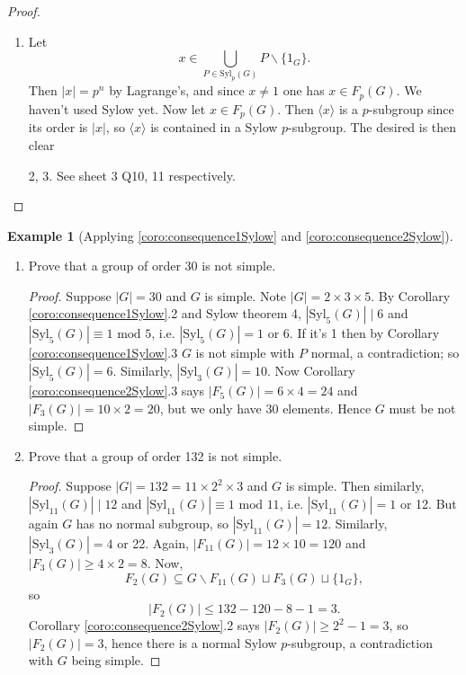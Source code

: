 \documentclass[a4paper]{article}
\newcommand{\Syl}{\text{Syl}}
\newcommand{\Mod}{\text{ mod }}
\theoremstyle{definition}
\newtheorem{example}[defn]{Example}
\begin{document}
\begin{proof}
\begin{enumerate}
\item Let \[
x\in \bigcup_{P\in\Syl_p(G)} P\backslash \{1_G\}.
\]
Then $|x|=p^n$ by Lagrange's, and since $x\neq 1$ one has $x\in F_p(G)$. We haven't used Sylow yet. Now let $x\in F_p(G)$. Then $\langle x\rangle$ is a $p$-subgroup since its order is $|x|$, so $\langle x\rangle$ is contained in a Sylow $p$-subgroup. The desired is then clear
\item[2, 3.] See sheet 3 Q10, 11 respectively.
\end{enumerate}
\end{proof}

\begin{example}[Applying \ref{coro:consequence1Sylow} and \ref{coro:consequence2Sylow}]
\label{example:strategy2}
\begin{enumerate}
\item Prove that a group of order 30 is not simple.
\begin{proof}
Suppose $|G|=30$ and $G$ is simple. Note $|G|=2\times 3\times 5$. By Corollary \ref{coro:consequence1Sylow}.2 and Sylow theorem 4, $|\Syl_5(G)|\mid 6$ and $|\Syl_5(G)|\equiv 1\Mod 5$, i.e. $|\Syl_5(G)|=1$ or 6. If it's 1 then by Corollary \ref{coro:consequence1Sylow}.3 $G$ is not simple with $P$ normal, a contradiction; so $|\Syl_5(G)|=6$. Similarly, $|\Syl_3(G)|=10$. Now Corollary \ref{coro:consequence2Sylow}.3 says $|F_5(G)|=6\times 4=24$ and $|F_3(G)|=10\times 2=20$, but we only have 30 elements. Hence $G$ must be not simple.
\end{proof}
\item Prove that a group of order 132 is not simple.
\begin{proof}
Suppose $|G|=132=11\times 2^2\times 3$ and $G$ is simple. Then similarly, $|\Syl_{11}(G)| \mid 12$ and $|\Syl_{11}(G)|\equiv 1\Mod 11$, i.e. $|\Syl_{11}(G)|=1$ or 12. But again $G$ has no normal subgroup, so $|\Syl_{11}(G)|=12$. Similarly, $|\Syl_3(G)|=4$ or 22. Again, $|F_{11}(G)|=12\times 10=120$ and $|F_3(G)|\geq 4\times 2=8$. Now,
\[
F_2(G)\subseteq G\backslash F_{11}(G) \sqcup F_3(G) \sqcup \{1_G\},
\]
so
\[
|F_2(G)|\leq 132-120-8-1=3.
\]
Corollary \ref{coro:consequence2Sylow}.2 says $|F_2(G)|\geq 2^2-1=3$, so $|F_2(G)|=3$, hence there is a normal Sylow $p$-subgroup, a contradiction with $G$ being simple.
\end{proof}
\end{enumerate}
\end{example}
\end{document}
